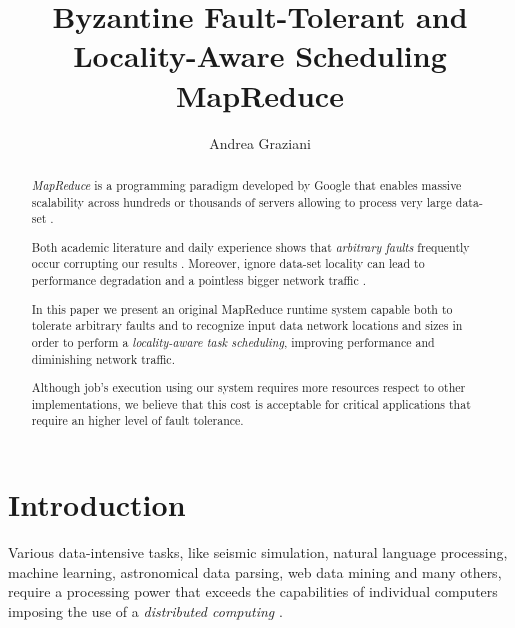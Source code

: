 \documentclass[sigchi]{acmart}
\begin{document}
\title{Byzantine Fault-Tolerant and Locality-Aware Scheduling MapReduce}

\author{Andrea Graziani}

\renewcommand{\shortauthors}{Andrea Graziani (0273395)}





\begin{abstract}
\textit{MapReduce} is a programming paradigm developed by Google that enables massive scalability across hundreds or thousands of servers allowing to process very large data-set \cite{IBMWhatIsMapReduce}.

Both academic literature and daily experience shows that \textit{arbitrary faults} frequently occur corrupting our results \cite{BFLMapReduce}. Moreover, ignore data-set locality can lead to performance degradation and a pointless bigger network traffic \cite{LARTS}.

In this paper we present an original MapReduce runtime system capable both to tolerate arbitrary faults and to recognize input data network locations and sizes in order to perform a \textit{locality-aware task scheduling}, improving performance and diminishing network traffic.

Although job's execution using our system requires more resources respect to other implementations, we believe that this cost is acceptable for critical applications that require an higher level of fault tolerance.
\end{abstract}

\maketitle

\section{Introduction}

Various data-intensive tasks, like seismic simulation, natural language processing, machine learning, astronomical data parsing, web data mining and many others, require a processing power that exceeds the capabilities of individual computers imposing the use of a \textit{distributed computing} \cite{LARTS}.
\end{document}
